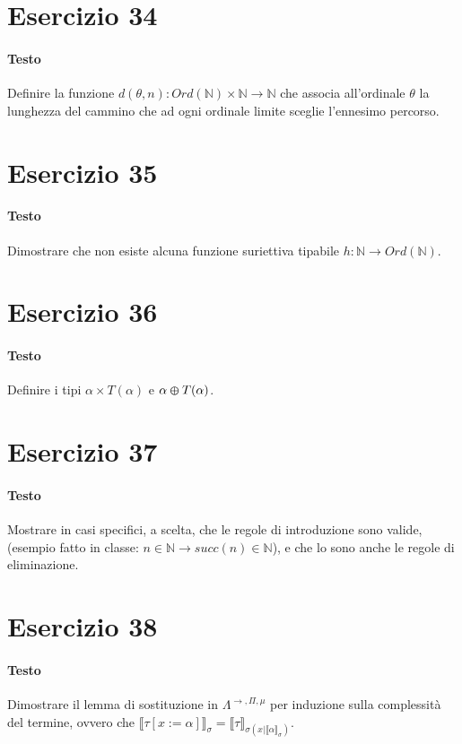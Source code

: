 \documentclass[a4paper,11pt]{article}
\begin{document}
\section*{Esercizio 34}
\paragraph{Testo}
Definire la funzione $d(\theta, n) : Ord(\mathbb{N}) \times \mathbb{N} \rightarrow \mathbb{N}$ che associa all’ordinale $\theta$ la lunghezza del cammino che ad ogni ordinale limite sceglie l’ennesimo percorso.

\section*{Esercizio 35}
\paragraph{Testo}
Dimostrare che non esiste alcuna funzione suriettiva tipabile $h : \mathbb{N} \rightarrow Ord(\mathbb{N})$.

\section*{Esercizio 36}
\paragraph{Testo}
Definire i tipi $\alpha \times T(\alpha)$ e $\alpha \varoplus T(\alpha)$.

\section*{Esercizio 37}
\paragraph{Testo}
Mostrare in casi specifici, a scelta, che le regole di introduzione sono valide, (esempio fatto in classe: $n \in \mathbb{N} \rightarrow succ(n) \in \mathbb{N}$), e che lo sono anche le regole di eliminazione.

\section*{Esercizio 38}
\paragraph{Testo}
Dimostrare il lemma di sostituzione in $\Lambda^{\rightarrow, \Pi, \mu}$ per induzione sulla complessità del termine, ovvero che $\llbracket \tau [x := \alpha]\rrbracket_\sigma = \llbracket \tau \rrbracket_{\sigma(x|\llbracket \alpha \rrbracket_\sigma)}$.
\end{document}
